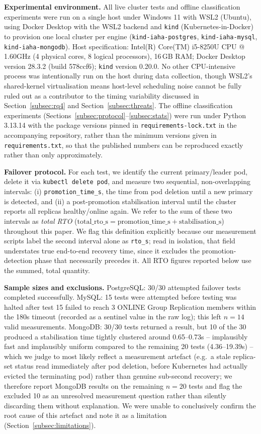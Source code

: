 \documentclass[iicol,pdflatex,sn-mathphys-num]{sn-jnl}
\theoremstyle{thmstyleone}
\theoremstyle{thmstylethree}
\begin{document}
\textbf{Experimental environment.} All live cluster tests and offline
classification experiments were run on a single host under Windows
11 with WSL2 (Ubuntu), using Docker Desktop with the WSL2 backend and
\texttt{kind} (Kubernetes-in-Docker) to provision one local cluster
per engine (\texttt{kind-iaha-postgres}, \texttt{kind-iaha-mysql},
\texttt{kind-iaha-mongodb}). Host specification: Intel(R) Core(TM)
i5-8250U CPU @ 1.60GHz (4 physical cores, 8 logical processors),
16\,GB RAM; Docker
Desktop version 28.3.2 (build 578ccf6); \texttt{kind} version 0.20.0.
No other CPU-intensive
process was intentionally run on the host during data collection,
though WSL2's shared-kernel virtualisation means host-level
scheduling noise cannot be fully ruled out as a contributor to the
timing variability discussed in Section~\ref{subsec:rq4} and
Section~\ref{subsec:threats}. The offline classification experiments
(Sections~\ref{subsec:protocol}--\ref{subsec:stats}) were run under
Python 3.13.14 with the package versions pinned in
\texttt{requirements-lock.txt} in the accompanying repository, rather
than the minimum versions given in \texttt{requirements.txt}, so that
the published numbers can be reproduced exactly rather than only
approximately.

\textbf{Failover protocol.} For each test, we identify the current
primary/leader pod, delete it via \texttt{kubectl delete pod}, and
measure two sequential, non-overlapping intervals: (i)
\texttt{promotion\_time\_s}, the time from pod deletion until a new
primary is detected, and (ii) a post-promotion stabilisation interval
until the cluster reports all replicas healthy/online again. We refer
to the sum of these two intervals as \emph{total RTO}
($\text{total\_rto\_s} = \text{promotion\_time\_s} + \text{stabilisation\_s}$)
throughout this paper. We flag this definition explicitly because our
measurement scripts label the second interval alone as
\texttt{rto\_s}; read in isolation, that field understates true
end-to-end recovery time, since it excludes the promotion-detection
phase that necessarily precedes it. All RTO figures reported below
use the summed, total quantity.

\textbf{Sample sizes and exclusions.} PostgreSQL: 30/30 attempted
failover tests completed successfully. MySQL: 15 tests were attempted
before testing was halted after test 15 failed to reach 3 ONLINE
Group Replication members within the 180s timeout (recorded as a
sentinel value in the raw log); this left $n=14$ valid measurements.
MongoDB: 30/30 tests returned a result, but 10 of the 30 produced a
stabilisation time tightly clustered around 0.65--0.73s -- implausibly
fast and implausibly uniform compared to the remaining 20 tests
(4.36--19.39s) -- which we judge to most likely reflect a measurement
artefact (e.g.\ a stale replica-set status read immediately after pod
deletion, before Kubernetes had actually evicted the terminating pod)
rather than genuine sub-second recovery; we therefore report MongoDB
results on the remaining $n=20$ tests and flag the excluded 10 as an
unresolved measurement question rather than silently discarding them
without explanation. We were unable to conclusively confirm the root
cause of this artefact and note it as a limitation
(Section~\ref{subsec:limitations}).
\end{document}
